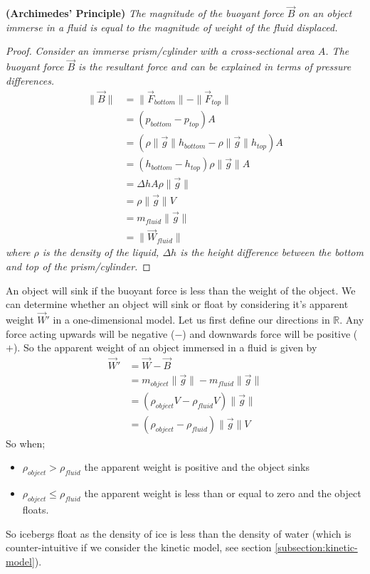 \begin{theorem}{\textbf{(Archimedes' Principle)}}
\textit{The magnitude of the buoyant force $\vec{B}$ on an object immerse in a fluid is equal to the magnitude of weight of the fluid displaced.}
\begin{proof}
\textit{Consider an immerse prism/cylinder with a cross-sectional area $A$. The buoyant force $\vec{B}$ is the resultant force and can be explained in terms of pressure differences.}
\begin{align*}
    \| \vec{B} \| &= \| \vec{F}_{bottom} \| - \| \vec{F}_{top} \| \\
    &= (p_{bottom} - p_{top}) A \\
    &= (\rho \| \vec{g} \| h_{bottom} - \rho \| \vec{g} \| h_{top}) A \\
    &= (h_{bottom} - h_{top}) \rho \| \vec{g} \| A \\
    &= \Delta h A \rho \| \vec{g} \| \\
    &= \rho \| \vec{g} \| V \\
    &= m_{fluid} \| \vec{g} \| \\
    &= \| \vec{W}_{fluid} \|
\end{align*}
\textit{where $\rho$ is the density of the liquid, $\Delta h$ is the height difference between the bottom and top of the prism/cylinder.}
\end{proof}

An object will sink if the buoyant force is less than the weight of the object. We can determine whether an object will sink or float by considering it's apparent weight $\vec{W}'$ in a one-dimensional model. Let us first define our directions in $\mathbb{R}$. Any force acting upwards will be negative ($-$) and downwards force will be positive ($+$). So the apparent weight of an object immersed in a fluid is given by 
\begin{align*}
    \vec{W}' &= \vec{W} - \vec{B} \\
    &= m_{object} \| \vec{g} \| - m_{fluid} \| \vec{g} \| \\
    &= (\rho_{object} V - \rho_{fluid} V) \| \vec{g} \| \\
    &= (\rho_{object} - \rho_{fluid}) \| \vec{g} \| V 
\end{align*}
So when;
\begin{itemize}
    \item $\rho_{object} > \rho_{fluid}$ the apparent weight is positive and the object sinks 
    \item $\rho_{object} \leq \rho_{fluid}$ the apparent weight is less than or equal to zero and the object floats.
\end{itemize}
So icebergs float as the density of ice is less than the density of water (which is counter-intuitive if we consider the kinetic model, see section \ref{subsection:kinetic-model}). 
\end{theorem}

